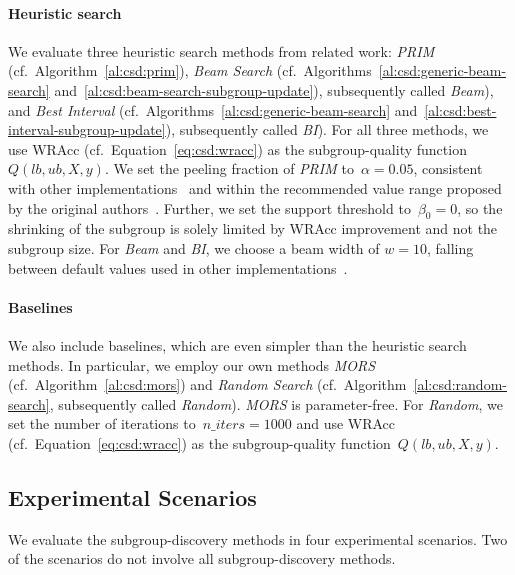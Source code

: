 \documentclass{article}
\theoremstyle{definition}
\begin{document}
\paragraph{Heuristic search}

We evaluate three heuristic search methods from related work:
\emph{PRIM} (cf.~Algorithm~\ref{al:csd:prim}), \emph{Beam Search} (cf.~Algorithms~\ref{al:csd:generic-beam-search} and~\ref{al:csd:beam-search-subgroup-update}), subsequently called \emph{Beam}), and \emph{Best Interval} (cf.~Algorithms~\ref{al:csd:generic-beam-search} and~\ref{al:csd:best-interval-subgroup-update}), subsequently called \emph{BI}).
For all three methods, we use WRAcc (cf.~Equation~\ref{eq:csd:wracc}) as the subgroup-quality function~$Q(\mathit{lb}, \mathit{ub}, X, y)$.
We set the peeling fraction of \emph{PRIM} to~$\alpha = 0.05$, consistent with other implementations~\cite{arzamasov2021reds, kwakkel2017exploratory} and within the recommended value range proposed by the original authors~\cite{friedman1999bump}.
Further, we set the support threshold to~$\beta_0 = 0$, so the shrinking of the subgroup is solely limited by WRAcc improvement and not the subgroup size.
For \emph{Beam} and \emph{BI}, we choose a beam width of $w=10$, falling between default values used in other implementations~\cite{arzamasov2021reds, lemmerich2019pysubgroup}.

\paragraph{Baselines}

We also include baselines, which are even simpler than the heuristic search methods.
In particular, we employ our own methods \emph{MORS} (cf.~Algorithm~\ref{al:csd:mors}) and \emph{Random Search} (cf.~Algorithm~\ref{al:csd:random-search}, subsequently called \emph{Random}).
\emph{MORS} is parameter-free.
For \emph{Random}, we set the number of iterations to~$\mathit{n\_iters} = 1000$ and use WRAcc (cf.~Equation~\ref{eq:csd:wracc}) as the subgroup-quality function~$Q(\mathit{lb}, \mathit{ub}, X, y)$.

\subsection{Experimental Scenarios}
\label{sec:csd:experimental-design:scenarios}

We evaluate the subgroup-discovery methods in four experimental scenarios.
Two of the scenarios do not involve all subgroup-discovery methods.
\end{document}
